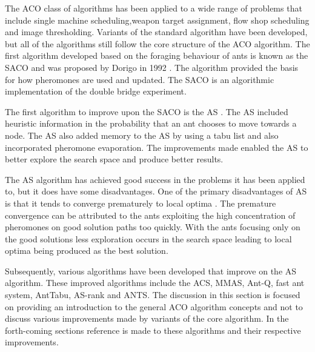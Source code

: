  The \gls{ACO} class of algorithms has been applied to a wide range of problems that include single machine scheduling\cite{ACOSingleMachine},weapon target assignment\cite{WeaponTargetACO}, flow shop scheduling\cite{ACOFlowShop} and image thresholding\cite{ACOImageThreshold}. Variants of the standard algorithm have been developed, but all of the algorithms still follow the core structure of the \gls{ACO} algorithm\cite{CompuIntelligenceIntro,FundamentalSwarm}.
The first algorithm developed based on the foraging behaviour of ants is known as the \gls{SACO} and was proposed by Dorigo in 1992 \cite{CompuIntelligenceIntro}. The algorithm provided the basis for how pheromones are used and updated. The \gls{SACO} is an algorithmic implementation of the double bridge experiment.

The first algorithm to improve upon the \gls{SACO} is the \gls{AS} \cite{CompuIntelligenceIntro,AntIntroTrends}. The \gls{AS} included heuristic information in the probability that an ant chooses to move towards a node. The \gls{AS} also added memory to the \gls{AS} by using a tabu list and also incorporated pheromone evaporation. The improvements made enabled the \gls{AS} to better explore the search space and produce better results\cite{CompuIntelligenceIntro,AntIntroTrends}. 

The \gls{AS} algorithm has achieved good success in the problems it has been applied to, but it does have some disadvantages\cite{ImpACOComplex,ACOSurvey}. One of the primary disadvantages of \gls{AS} is that it tends to converge prematurely to local optima \cite{FundamentalSwarm,ImpACOComplex}. The premature convergence can be attributed to the ants exploiting the high concentration of pheromones on good solution paths too quickly\cite{FundamentalSwarm}. With the ants focusing only on the good solutions less exploration occurs in the search space leading to local optima being produced as the best solution\cite{FundamentalSwarm}.

Subsequently, various algorithms have been developed that improve on the \gls{AS} algorithm. These improved algorithms include the \gls{ACS}, \gls{MMAS}, Ant-Q, fast ant system, AntTabu, \gls{AS}-rank and \gls{ANTS}\cite{CompuIntelligenceIntro,AntIntroTrends}. The discussion in this section is focused on providing an introduction to the general \gls{ACO} algorithm concepts and not to discuss various improvements made by variants of the core algorithm. In the forth-coming sections reference is made to these algorithms and their respective improvements.

